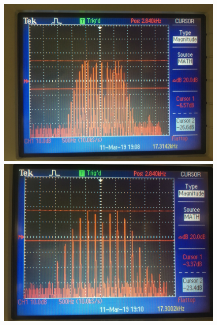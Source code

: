 \begin{figure}[H]
	\centering
	\begin{minipage}{0.4\linewidth}
		\centering
		\includegraphics[width=\linewidth]{photo/task33(1).jpg}
	\end{minipage}
	\begin{minipage}{0.4\linewidth}
		\centering
		\includegraphics[width=\linewidth]{photo/task33(2).jpg}
	\end{minipage}
	\begin{minipage}{0.4\linewidth}
		\centering

\end{minipage}
\end{figure}
